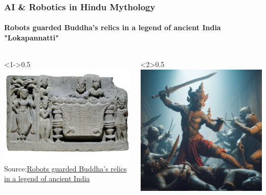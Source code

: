 \documentclass{beamer}
\begin{document}
\begin{frame}
  \frametitle{AI \& Robotics in Hindu Mythology}
  \framesubtitle{Robots guarded Buddha's relics in a legend of ancient India "Lokapannatti"}

  \begin{columns}
    \begin{column}<1->{0.5\textwidth}
      \includegraphics[width=\textwidth]{Buddha_Relic_Robots.jpg}
      Source:\href{https://theconversation.com/robots-guarded-buddhas-relics-in-a-legend-of-ancient-india-110078}{Robots guarded Buddha’s relics in a legend of ancient India}
    \end{column}
    \begin{column}<2>{0.5\textwidth}
      \includegraphics[width=\textwidth]{IndiaMythonRobot.jpeg}
    \end{column}
  \end{columns}
  

\end{frame}
\end{document}
